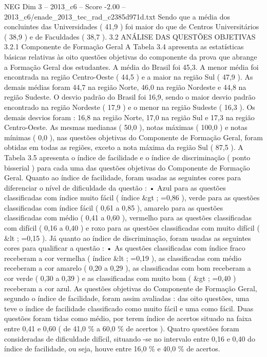 \begin{textsample}{NEG Dim 3 – 2013\_c6 – Score -2.00 – 2013\_c6/enade\_2013\_tec\_rad\_c2385d971d.txt}
Sendo que a média dos concluintes das Universidades ( 41,9 ) foi maior do que de Centros Universitários ( 38,9 ) e de Faculdades ( 38,7 ). 3.2 ANÁLISE DAS QUESTÕES OBJETIVAS 3.2.1 Componente de Formação Geral A Tabela 3.4 apresenta as estatísticas básicas relativas às oito questões objetivas do componente da prova que abrange a Formação Geral dos estudantes.
A média do Brasil foi 45,3.
A menor média foi encontrada na região Centro-Oeste ( 44,5 ) e a maior na região Sul ( 47,9 ).
As demais médias foram 44,7 na região Norte, 46,0 na região Nordeste e 44,8 na região Sudeste.
O desvio padrão do Brasil foi 16,9, sendo o maior desvio padrão encontrado na região Nordeste ( 17,9 ) e o menor na região Sudeste ( 16,3 ).
Os demais desvios foram : 16,8 na região Norte, 17,0 na região Sul e 17,3 na região Centro-Oeste.
As mesmas medianas ( 50,0 ), notas máximas ( 100,0 ) e notas mínimas ( 0,0 ), nas questões objetivas do Componente de Formação Geral, foram obtidas em todas as regiões, exceto a nota máxima da região Sul ( 87,5 ).
A Tabela 3.5 apresenta o índice de facilidade e o índice de discriminação ( ponto bisserial ) para cada uma das questões objetivas do Componente de Formação Geral.
Quanto ao índice de facilidade, foram usadas as seguintes cores para diferenciar o nível de dificuldade da questão : • Azul para as questões classificadas com índice muito fácil ( índice \&gt ; =0,86 ), verde para as questões classificadas com índice fácil ( 0,61 a 0,85 ), amarelo para as questões classificadas com médio ( 0,41 a 0,60 ), vermelho para as questões classificadas com difícil ( 0,16 a 0,40 ) e roxo para as questões classificadas com muito difícil ( \&lt ; =0,15 ).
Já quanto ao índice de discriminação, foram usadas as seguintes cores para qualificar a questão : • As questões classificadas com índice fraco receberam a cor vermelha ( índice \&lt ; =0,19 ), as classificadas com médio receberam a cor amarelo ( 0,20 a 0,29 ), as classificadas com bom receberam a cor verde ( 0,30 a 0,39 ) e as classificadas com muito bom ( \&gt ; =0,40 ) receberam a cor azul.
As questões objetivas do Componente de Formação Geral, segundo o índice de facilidade, foram assim avaliadas : das oito questões, uma teve o índice de facilidade classificado como muito fácil e uma como fácil.
Duas questões foram tidas como médio, por terem índice de acertos situado na faixa entre 0,41 e 0,60 ( de 41,0 \% a 60,0 \% de acertos ).
Quatro questões foram consideradas de dificuldade difícil, situando -se no intervalo entre 0,16 e 0,40 do índice de facilidade, ou seja, houve entre 16,0 \% e 40,0 \% de acertos.

\end{textsample}
